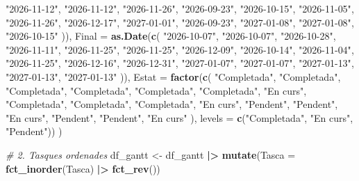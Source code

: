 \documentclass[CAT]{TFUOC}%
\newenvironment{Shaded}{\begin{snugshade}}{\end{snugshade}}
\newcommand{\AttributeTok}[1]{\textcolor[rgb]{0.13,0.29,0.53}{#1}}
\newcommand{\CommentTok}[1]{\textcolor[rgb]{0.56,0.35,0.01}{\textit{#1}}}
\newcommand{\FunctionTok}[1]{\textcolor[rgb]{0.13,0.29,0.53}{\textbf{#1}}}
\newcommand{\NormalTok}[1]{#1}
\newcommand{\OtherTok}[1]{\textcolor[rgb]{0.56,0.35,0.01}{#1}}
\newcommand{\SpecialCharTok}[1]{\textcolor[rgb]{0.81,0.36,0.00}{\textbf{#1}}}
\newcommand{\StringTok}[1]{\textcolor[rgb]{0.31,0.60,0.02}{#1}}
\begin{document}
\begin{Shaded}
\begin{Highlighting}[]
    \StringTok{"2026{-}11{-}12"}\NormalTok{, }\StringTok{"2026{-}11{-}12"}\NormalTok{, }\StringTok{"2026{-}11{-}26"}\NormalTok{, }\StringTok{"2026{-}09{-}23"}\NormalTok{,}
    \StringTok{"2026{-}10{-}15"}\NormalTok{, }\StringTok{"2026{-}11{-}05"}\NormalTok{, }\StringTok{"2026{-}11{-}26"}\NormalTok{, }\StringTok{"2026{-}12{-}17"}\NormalTok{,}
    \StringTok{"2027{-}01{-}01"}\NormalTok{, }\StringTok{"2026{-}09{-}23"}\NormalTok{, }\StringTok{"2027{-}01{-}08"}\NormalTok{, }\StringTok{"2027{-}01{-}08"}\NormalTok{, }
    \StringTok{"2026{-}10{-}15"}
\NormalTok{  )),}
  \AttributeTok{Final =} \FunctionTok{as.Date}\NormalTok{(}\FunctionTok{c}\NormalTok{(}
    \StringTok{"2026{-}10{-}07"}\NormalTok{, }\StringTok{"2026{-}10{-}07"}\NormalTok{, }\StringTok{"2026{-}10{-}28"}\NormalTok{, }\StringTok{"2026{-}11{-}11"}\NormalTok{,}
    \StringTok{"2026{-}11{-}25"}\NormalTok{, }\StringTok{"2026{-}11{-}25"}\NormalTok{, }\StringTok{"2026{-}12{-}09"}\NormalTok{, }\StringTok{"2026{-}10{-}14"}\NormalTok{,}
    \StringTok{"2026{-}11{-}04"}\NormalTok{, }\StringTok{"2026{-}11{-}25"}\NormalTok{, }\StringTok{"2026{-}12{-}16"}\NormalTok{, }\StringTok{"2026{-}12{-}31"}\NormalTok{,}
    \StringTok{"2027{-}01{-}07"}\NormalTok{, }\StringTok{"2027{-}01{-}07"}\NormalTok{, }\StringTok{"2027{-}01{-}13"}\NormalTok{, }\StringTok{"2027{-}01{-}13"}\NormalTok{, }
    \StringTok{"2027{-}01{-}13"}
\NormalTok{  )),}
  \AttributeTok{Estat =} \FunctionTok{factor}\NormalTok{(}\FunctionTok{c}\NormalTok{(}
    \StringTok{"Completada"}\NormalTok{, }\StringTok{"Completada"}\NormalTok{, }\StringTok{"Completada"}\NormalTok{, }\StringTok{"Completada"}\NormalTok{,}
    \StringTok{"Completada"}\NormalTok{, }\StringTok{"Completada"}\NormalTok{, }\StringTok{"En curs"}\NormalTok{, }\StringTok{"Completada"}\NormalTok{,}
    \StringTok{"Completada"}\NormalTok{, }\StringTok{"Completada"}\NormalTok{, }\StringTok{"En curs"}\NormalTok{, }\StringTok{"Pendent"}\NormalTok{,}
    \StringTok{"Pendent"}\NormalTok{, }\StringTok{"En curs"}\NormalTok{, }\StringTok{"Pendent"}\NormalTok{, }\StringTok{"Pendent"}\NormalTok{, }\StringTok{"En curs"}
\NormalTok{  ), }\AttributeTok{levels =} \FunctionTok{c}\NormalTok{(}\StringTok{"Completada"}\NormalTok{, }\StringTok{"En curs"}\NormalTok{, }\StringTok{"Pendent"}\NormalTok{))}
\NormalTok{)}

\CommentTok{\# 2. Tasques ordenades}
\NormalTok{df\_gantt }\OtherTok{\textless{}{-}}\NormalTok{ df\_gantt }\SpecialCharTok{|\textgreater{}} 
  \FunctionTok{mutate}\NormalTok{(}\AttributeTok{Tasca =} \FunctionTok{fct\_inorder}\NormalTok{(Tasca) }\SpecialCharTok{|\textgreater{}} \FunctionTok{fct\_rev}\NormalTok{())}


\end{Highlighting}
\end{Shaded}
\end{document}
